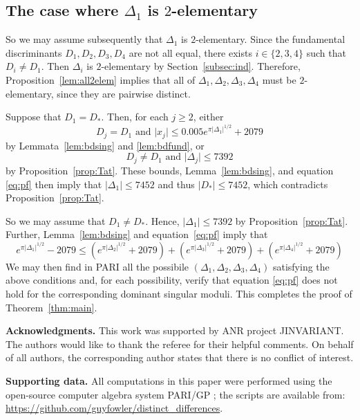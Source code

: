 \documentclass[12pt,a4paper,oneside]{amsart}
\begin{document}
	 \subsection{The case where \texorpdfstring{$\Delta_1$}{Delta 1} is \texorpdfstring{$2$}{2}-elementary}\label{subsec:D12elem}
	
	So we may assume subsequently that $\Delta_1$ is $2$-elementary. Since the fundamental discriminants $D_1, D_2, D_3, D_4$ are not all equal, there exists $i \in \{2, 3, 4\}$ such that $D_i \neq D_1$. Then $\Delta_i$ is $2$-elementary by Section~\ref{subsec:ind}. Therefore, Proposition~\ref{lem:all2elem} implies that all of $\Delta_1, \Delta_2, \Delta_3, \Delta_4$ must be $2$-elementary, since they are pairwise distinct.
	
	Suppose that $D_1 = D_*$. Then, for each $j \geq 2$, either
	\[ D_j = D_1 \mbox{ and } \lvert x_j \rvert \leq 0.005 e^{\pi \lvert \Delta_1 \rvert^{1/2}} + 2079\]
	by Lemmata~\ref{lem:bdsing} and \ref{lem:bdfund}, or
	\[ D_j \neq D_1 \mbox{ and } \lvert \Delta_j \rvert \leq 7392\]
	by Proposition~\ref{prop:Tat}. These bounds, Lemma~\ref{lem:bdsing}, and equation \eqref{eq:pf} then imply that $\lvert \Delta_1 \rvert \leq 7452$ and thus $\lvert D_* \rvert \leq 7452$, which contradicts Proposition~\ref{prop:Tat}. 
	
	So we may assume that $D_1 \neq D_*$. Hence, $\lvert \Delta_1 \rvert \leq 7392$ by Proposition~\ref{prop:Tat}. Further, Lemma~\ref{lem:bdsing} and equation~\eqref{eq:pf} imply that
	\begin{equation}\label{eq:4disc3} e^{\pi \lvert \Delta_1 \rvert^{1/2}} - 2079 \leq (e^{\pi \lvert \Delta_2 \rvert^{1/2}} +2079) + (e^{\pi \lvert \Delta_3 \rvert^{1/2}} + 2079) + (e^{\pi \lvert \Delta_4 \rvert^{1/2}} + 2079)\end{equation}
	We may then find in PARI all the possibile $(\Delta_1, \Delta_2, \Delta_3, \Delta_4)$ satisfying the above conditions and, for each possibility, verify that equation \eqref{eq:pf} does not hold for the corresponding dominant singular moduli.
    This completes the proof of Theorem~\ref{thm:main}.
	

    
	
	\bigskip
	\textbf{Acknowledgments.} This work was supported by ANR project JINVARIANT. The authors would like to thank the referee for their helpful comments. On behalf of all authors, the corresponding author states that there is no conflict of interest. 

\smallskip

    \textbf{Supporting data.} All computations in this paper were performed using the open-source computer algebra system PARI/GP \cite{PARI2}; the scripts are available from: \url{https://github.com/guyfowler/distinct_differences}.
	
\end{document}
